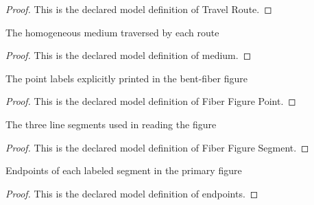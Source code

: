 \begin{proof}
  This is the declared model definition of Travel Route.
\end{proof}
\begin{definition}[medium]
  \label{def:physics:phyx-mini-0107:phyxminiproblems-problemphyxmini0107-travelroute-medium}
  The homogeneous medium traversed by each route
\end{definition}
\begin{proof}
  This is the declared model definition of medium.
\end{proof}
\begin{definition}
  \label{def:physics:phyx-mini-0107:phyxminiproblems-problemphyxmini0107-fiberfigurepoint}
  The point labels explicitly printed in the bent-fiber figure
\end{definition}
\begin{proof}
  This is the declared model definition of Fiber Figure Point.
\end{proof}
\begin{definition}
  \label{def:physics:phyx-mini-0107:phyxminiproblems-problemphyxmini0107-fiberfiguresegment}
  The three line segments used in reading the figure
\end{definition}
\begin{proof}
  This is the declared model definition of Fiber Figure Segment.
\end{proof}
\begin{definition}[endpoints]
  \label{def:physics:phyx-mini-0107:phyxminiproblems-problemphyxmini0107-fiberfiguresegment-endpoints}
  Endpoints of each labeled segment in the primary figure
\end{definition}
\begin{proof}
  This is the declared model definition of endpoints.
\end{proof}
